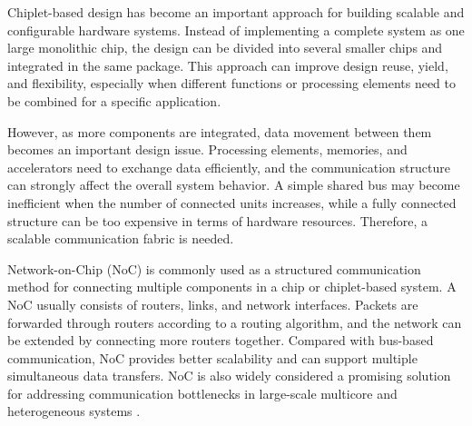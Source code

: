 \label{ch1:introduction}

Chiplet-based design has become an important approach for building scalable and configurable hardware systems. Instead of implementing a complete system as one large monolithic chip, the design can be divided into several smaller chips and integrated in the same package. This approach can improve design reuse, yield, and flexibility, especially when different functions or processing elements need to be combined for a specific application.

However, as more components are integrated, data movement between them becomes an important design issue. Processing elements, memories, and accelerators need to exchange data efficiently, and the communication structure can strongly affect the overall system behavior. A simple shared bus may become inefficient when the number of connected units increases, while a fully connected structure can be too expensive in terms of hardware resources. Therefore, a scalable communication fabric is needed.

Network-on-Chip (NoC) is commonly used as a structured communication method for connecting multiple components in a chip or chiplet-based system. A NoC usually consists of routers, links, and network interfaces. Packets are forwarded through routers according to a routing algorithm, and the network can be extended by connecting more routers together. Compared with bus-based communication, NoC provides better scalability and can support multiple simultaneous data transfers. NoC is also widely considered a promising solution for addressing communication bottlenecks in large-scale multicore and heterogeneous systems \cite{10819599}.






   
